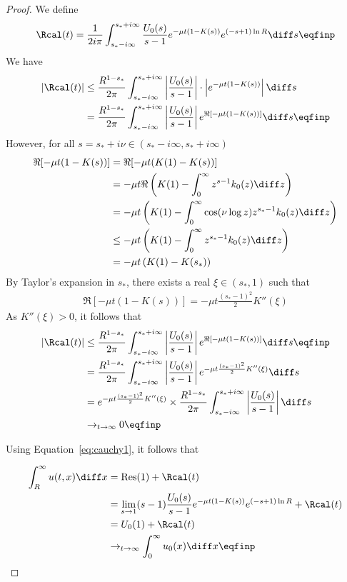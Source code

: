 \begin{proof}
We define
\begin{align*}
    \Rcal(t) = \frac{1}{2i\pi} \int_{s_*-i\infty}^{s_*+i\infty} \frac{U_0(s)}{s-1} e^{-\mu t(1 - K(s))} e^{(-s+1)\ln R} \diff s
    \eqfinp
\end{align*}
We have 
\begin{align*}
    |\Rcal(t)| 
    &\leq \frac{R^{1-s_*}}{2\pi} \int_{s_*-i\infty}^{s_*+i\infty} \left|\frac{U_0(s) }{s-1}\right| \cdot \left|e^{-\mu t(1 - K(s))}\right| \diff s \\
    &= \frac{R^{1-s_*}}{2\pi} \int_{s_*-i\infty}^{s_*+i\infty} \left|\frac{U_0(s) }{s-1}\right| e^{\Re[-\mu t(1 - K(s))]} \diff s
    \eqfinp
\end{align*}
However, for all $s = s_* + i\nu \in (s_*-i \infty, s_* + i \infty)$
\begin{align*}
    \Re[-\mu t(1 - K(s))] 
    &= \Re[-\mu t(K(1) - K(s))] \\
    &= -\mu t \Re\left( K(1) - \int_0^\infty z^{s-1}k_0(z)\diff z  \right) \\
    &=  -\mu t\left( K(1) - \int_0^\infty \cos(\nu \log z) z^{s_*-1}k_0(z)\diff z  \right) \\
    &\leq -\mu t \left( K(1) - \int_0^\infty z^{s_*-1}k_0(z)\diff z  \right) \\
    &= -\mu t \left( K(1) - K(s_*)  \right)
\end{align*}
By Taylor's expansion in $s_*$, there exists a real $\xi \in (s_*, 1)$ such that 
\begin{align*}
    \Re[-\mu t(1 - K(s))] = - \mu t \frac{(s_*-1)^2}{2}  K''(\xi) 
\end{align*}
As $ K''(\xi) > 0$, it follows that 
\begin{align*}
    |\Rcal(t)| 
    &\leq \frac{R^{1-s_*}}{2\pi} \int_{s_*-i\infty}^{s_*+i\infty} \left|\frac{U_0(s) }{s-1}\right| e^{\Re[-\mu t(1 - K(s))]} \diff s
    \eqfinp \\
    &= \frac{R^{1-s_*}}{2\pi} \int_{s_*-i\infty}^{s_*+i\infty} \left|\frac{U_0(s) }{s-1}\right| e^{- \mu t \frac{(s_*-1)^2}{2}  K''(\xi) } \diff s \\
    &= e^{- \mu t \frac{(s_*-1)^2}{2}  K''(\xi)} \times \frac{R^{1-s_*}}{2\pi} \int_{s_*-i\infty}^{s_*+i\infty} \left|\frac{U_0(s) }{s-1}\right| \diff s \\
    &\to_{t \to \infty} 0
    \eqfinp
\end{align*}

Using Equation~\ref{eq:cauchy1}, it follows that 

\begin{align*}
    \int_R^\infty u(t,x) \diff x &= \mathrm{Res(1)} + \Rcal(t) \\
    &= \lim_{s \to 1} (s-1)\frac{U_0(s)}{s-1} e^{-\mu t(1 - K(s))} e^{(-s+1)\ln R}  + \Rcal(t)\\
    &= U_0(1) + \Rcal(t)\\
    &\to_{t \to \infty} \int_0^\infty u_0(x) \diff x
    \eqfinp
\end{align*}


\end{proof}
